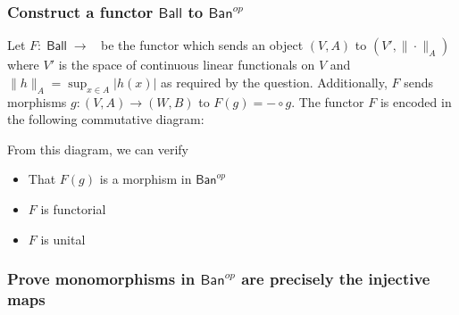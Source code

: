 \documentclass{article}
\DeclareMathOperator{\banop}{\textsf{Ban}^{op}}
\DeclareMathOperator{\ball}{\textsf{Ball}}
\begin{document}
\subsubsection{Construct a functor $\textsf{Ball}$ to $\textsf{Ban}^{op}$ }

Let $F:\ball \rightarrow \banop$ be the functor which sends an object $(V,A)$ to $(V',\|\cdot\|_A)$ where $V'$ is the space of continuous linear functionals on $V$ and $\|h\|_A=\sup_{x\in A}|h(x)|$ as required by the question.
Additionally, $F$ sends morphisms $g:(V,A)\rightarrow (W,B)$ to $F(g)= - \circ{g}$.
The functor $F$ is encoded in the following commutative diagram:

\begin{center}
\end{center}

\noindent From this diagram, we can verify
\begin{itemize}
	\item That $F(g)$ is a morphism in $\textsf{Ban}^{op}$
	\item $F$ is functorial
	\item $F$ is unital
\end{itemize}

\subsubsection{Prove monomorphisms in $\textsf{Ban}^{op}$ are precisely the injective maps}
\end{document}
